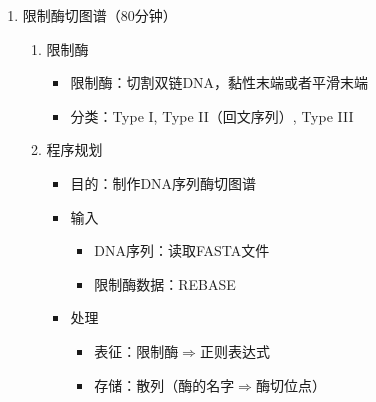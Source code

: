 \documentclass{TIJMUjiaoanLL}
\begin{document}
\begin{enumerate}
\begin{enumerate}
      \item 生物学应用\textcolor{red}{（综合运用前述理论知识，讲解正则表达式在专业中的应用）}
	\vspace{-1em}
	\begin{multicols}{2}
	  \begin{itemize}
	    \item 匹配1～6号染色体
	    \item 匹配任意一个碱基/核苷酸
	    \item \textit{Bst}YI的切割序列（RGATCY）
	    \item \verb|<A-X-[ST](2)-X(0,1)-{V}|
	  \end{itemize}
	  \begin{itemize}
	    \item \verb|/chr[1-6]/|
	    \item \verb|/[ACGTU]/|
	    \item \verb|/[AG]GATC[TC]/|
	    \item \verb|/^A.[ST]{2}.?[^V]/|
	  \end{itemize}
	\end{multicols}
	\vspace{-1em}
    \end{enumerate}
  \item 限制酶切图谱（80分钟）
    \begin{enumerate}
      \item 限制酶
	\begin{itemize}
	  \item 限制酶：切割双链DNA，黏性末端或者平滑末端
	  \item 分类：Type I, Type II（回文序列）, Type III
	\end{itemize}
      \item 程序规划
	\begin{itemize}
	  \item 目的：制作DNA序列酶切图谱
	  \item 输入
	    \begin{itemize}
	      \item DNA序列：读取FASTA文件
	      \item 限制酶数据：REBASE
	    \end{itemize}
	  \item 处理
	    \begin{itemize}
	      \item 表征：限制酶$\Rightarrow$正则表达式
	      \item 存储：散列（酶的名字$\Rightarrow$酶切位点）

\end{itemize}
\end{itemize}
\end{enumerate}
\end{enumerate}
\end{document}
